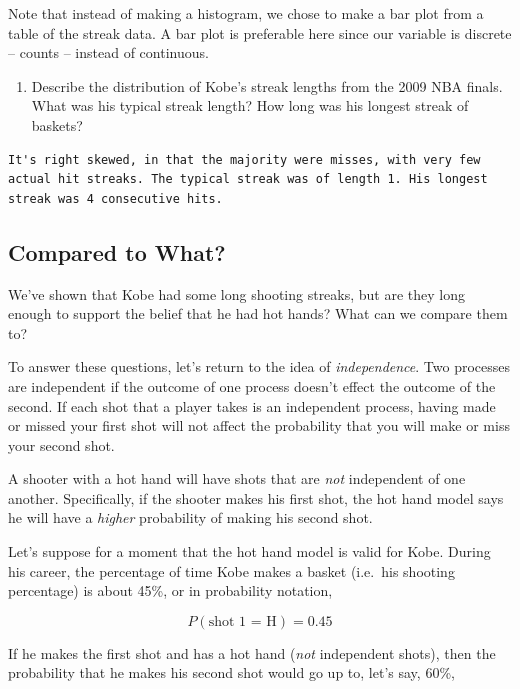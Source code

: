 \documentclass[]{article}
\providecommand{\tightlist}{%
  \setlength{\itemsep}{0pt}\setlength{\parskip}{0pt}}
\begin{document}
Note that instead of making a histogram, we chose to make a bar plot
from a table of the streak data. A bar plot is preferable here since our
variable is discrete -- counts -- instead of continuous.

\begin{enumerate}
\def\labelenumi{\arabic{enumi}.}
\setcounter{enumi}{1}
\tightlist
\item
  Describe the distribution of Kobe's streak lengths from the 2009 NBA
  finals. What was his typical streak length? How long was his longest
  streak of baskets?
\end{enumerate}

\begin{verbatim}
It's right skewed, in that the majority were misses, with very few actual hit streaks. The typical streak was of length 1. His longest streak was 4 consecutive hits.
\end{verbatim}

\subsection{Compared to What?}\label{compared-to-what}

We've shown that Kobe had some long shooting streaks, but are they long
enough to support the belief that he had hot hands? What can we compare
them to?

To answer these questions, let's return to the idea of
\emph{independence}. Two processes are independent if the outcome of one
process doesn't effect the outcome of the second. If each shot that a
player takes is an independent process, having made or missed your first
shot will not affect the probability that you will make or miss your
second shot.

A shooter with a hot hand will have shots that are \emph{not}
independent of one another. Specifically, if the shooter makes his first
shot, the hot hand model says he will have a \emph{higher} probability
of making his second shot.

Let's suppose for a moment that the hot hand model is valid for Kobe.
During his career, the percentage of time Kobe makes a basket (i.e.~his
shooting percentage) is about 45\%, or in probability notation,

\[ P(\textrm{shot 1 = H}) = 0.45 \]

If he makes the first shot and has a hot hand (\emph{not} independent
shots), then the probability that he makes his second shot would go up
to, let's say, 60\%,
\end{document}
